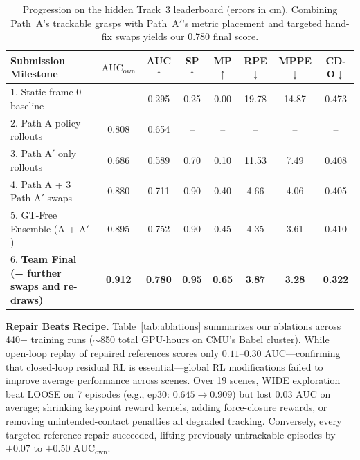 \documentclass[10pt]{nvidiaextabstract}
\newcommand{\ownauc}{\ensuremath{\mathrm{AUC}_{\text{own}}}\xspace}
\begin{document}
\begin{table}[t]
  \centering\footnotesize
  \setlength{\tabcolsep}{2.8pt}
  \begin{tabular}{@{}lccccccc@{}}
    \toprule
    \textbf{Submission Milestone} & \textbf{\ownauc} & \textbf{AUC}$\uparrow$ & \textbf{SP}$\uparrow$ & \textbf{MP}$\uparrow$ & \textbf{RPE}$\downarrow$ & \textbf{MPPE}$\downarrow$ & \textbf{CD-O}$\downarrow$ \\
    \midrule
    1. Static frame-0 baseline & -- & 0.295 & 0.25 & 0.00 & 19.78 & 14.87 & 0.473 \\
    2. Path A policy rollouts & 0.808 & 0.654 & -- & -- & -- & -- & -- \\
    3. Path A$'$ only rollouts & 0.686 & 0.589 & 0.70 & 0.10 & 11.53 & 7.49 & 0.408 \\
    4. Path A + 3 Path A$'$ swaps & 0.880 & 0.711 & 0.90 & 0.40 & 4.66 & 4.06 & 0.405 \\
    5. GT-Free Ensemble (A + A$'$) & 0.895 & 0.752 & 0.90 & 0.45 & 4.35 & 3.61 & 0.410 \\
    6. \textbf{Team Final (+ further swaps and re-draws)} & \textbf{0.912} & \textbf{0.780} & \textbf{0.95} & \textbf{0.65} & \textbf{3.87} & \textbf{3.28} & \textbf{0.322} \\
    \bottomrule
  \end{tabular}
  \vspace{-2mm}
  \caption{Progression on the hidden Track~3 leaderboard (errors in cm). Combining Path~A's trackable grasps with Path~A$'$'s metric placement and targeted hand-fix swaps yields our 0.780 final score.}
  \label{tab:kaggle}
  \vspace{-3mm}
\end{table}

\textbf{Repair Beats Recipe.} Table~\ref{tab:ablations} summarizes our ablations across 440+ training runs ($\sim$850 total GPU-hours on CMU's Babel cluster). While open-loop replay of repaired references scores only $0.11$--$0.30$ AUC—confirming that closed-loop residual RL is essential—global RL modifications failed to improve average performance across scenes. Over 19 scenes, WIDE exploration beat LOOSE on 7 episodes (e.g., ep30: $0.645 \rightarrow 0.909$) but lost $0.03$ AUC on average; shrinking keypoint reward kernels, adding force-closure rewards, or removing unintended-contact penalties all degraded tracking. Conversely, every targeted reference repair succeeded, lifting previously untrackable episodes by $+0.07$ to $+0.50$ \ownauc.
\end{document}
